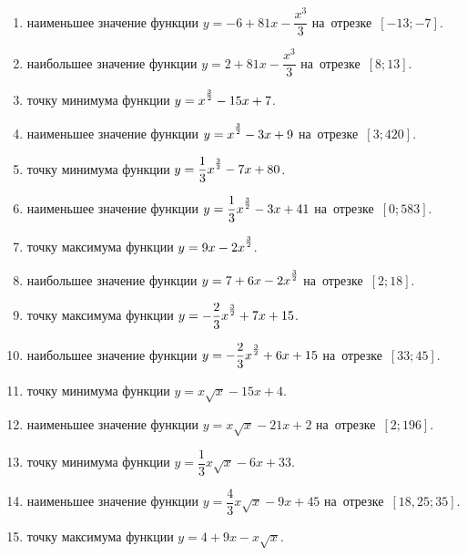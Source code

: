 \documentclass[a4paper,10pt]{article}
\begin{document}
\begin{enumerate}
\item {} наименьшее значение функции $y=-6 +81x-\dfrac{x^3}{3}$ на~отрезке~$\left[-13;-7\right]$.

\item {} наибольшее значение функции $y=2 +81x-\dfrac{x^3}{3}$ на~отрезке~$\left[8;13\right]$.

\item {} точку минимума функции $y=x\strut^{\frac{3}{2}} -15x+7$.

\item {} наименьшее значение функции $y=x\strut^{\frac{3}{2}} -3x+9$ на~отрезке~$\left[3;420\right]$.

\item {} точку минимума функции $y=\dfrac{1}{3}x\strut^{\frac{3}{2}} -7x+80$.

\item {} наименьшее значение функции $y=\dfrac{1}{3}x\strut^{\frac{3}{2}} -3x+41$ на~отрезке~$\left[0;583\right]$.

\item {} точку максимума функции $y=9x-2x\strut^{\frac{3}{2}}$.

\item {} наибольшее значение функции $y=7+6x-2x\strut^{\frac{3}{2}}$ на~отрезке~$\left[2;18\right]$.

\item {} точку максимума функции $y=-\dfrac{2}{3}x\strut^{\frac{3}{2}} +7x+15$.

\item {} наибольшее значение функции $y=-\dfrac{2}{3}x\strut^{\frac{3}{2}} +6x+15$ на~отрезке~$\left[33;45\right]$.

\item {} точку минимума функции $y=x\sqrt{x} -15x+4$.

\item {} наименьшее значение функции $y=x\sqrt{x} -21x+2$ на~отрезке~$\left[2;196\right]$.

\item {} точку минимума функции $y=\dfrac{1}{3}x\sqrt{x} -6x+33$.

\item {} наименьшее значение функции $y=\dfrac{4}{3}x\sqrt{x} -9x+45$ на~отрезке~$\left[18,25;35\right]$.

\item {} точку максимума функции $y=4+9x -x\sqrt{x}$.


\end{enumerate}
\end{document}
